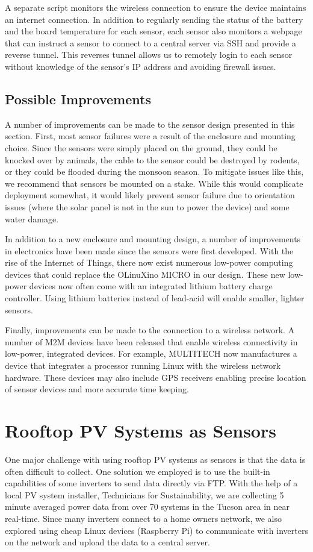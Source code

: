A separate script monitors the wireless connection to ensure the
device maintains an internet connection.
In addition to regularly sending the status of the battery and the
board temperature for each sensor, each sensor also monitors a webpage
that can instruct a sensor to connect to a central server via SSH and
provide a reverse tunnel.
This reverses tunnel allows us to remotely login to each sensor without
knowledge of the sensor's IP address and avoiding firewall issues.

\subsection{Possible Improvements}
\label{sec:sensor_improvements}
A number of improvements can be made to the sensor design presented in
this section.
First, most sensor failures were a result of the enclosure and
mounting choice.
Since the sensors were simply placed on the ground, they could be
knocked over by animals, the cable to the sensor could be destroyed by
rodents, or they could be flooded during the monsoon season.
To mitigate issues like this, we recommend that sensors be mounted on
a stake.
While this would complicate deployment somewhat, it would likely
prevent sensor failure due to orientation issues (where the solar
panel is not in the sun to power the device) and some water damage.

In addition to a new enclosure and mounting design, a number of
improvements in electronics have been made since the sensors were first
developed.
With the rise of the Internet of Things, there now exist numerous
low-power computing devices that could replace the OLinuXino MICRO in
our design.
These new low-power devices now often come with an integrated lithium
battery charge controller.
Using lithium batteries instead of lead-acid will enable smaller,
lighter sensors.

Finally, improvements can be made to the connection to a wireless
network.
A number of M2M devices have been released that enable wireless
connectivity in low-power, integrated devices.
For example, MULTITECH now manufactures a device that integrates a
processor running Linux with the wireless network hardware.
These devices may also include GPS receivers enabling precise location
of sensor devices and more accurate time keeping.

\section{Rooftop PV Systems as Sensors}
\label{sec:pv_sensors}
One major challenge with using rooftop PV systems as sensors is that
the data is often difficult to collect.
One solution we employed is to use the built-in capabilities of some
inverters to send data directly via FTP.
With the help of a local PV system installer, Technicians for
Sustainability, we are collecting 5 minute averaged power data from
over 70 systems in the Tucson area in near real-time.
Since many inverters connect to a home owners network, we also
explored using cheap Linux devices (Raspberry Pi) to communicate with
inverters on the network and upload the data to a central server.

